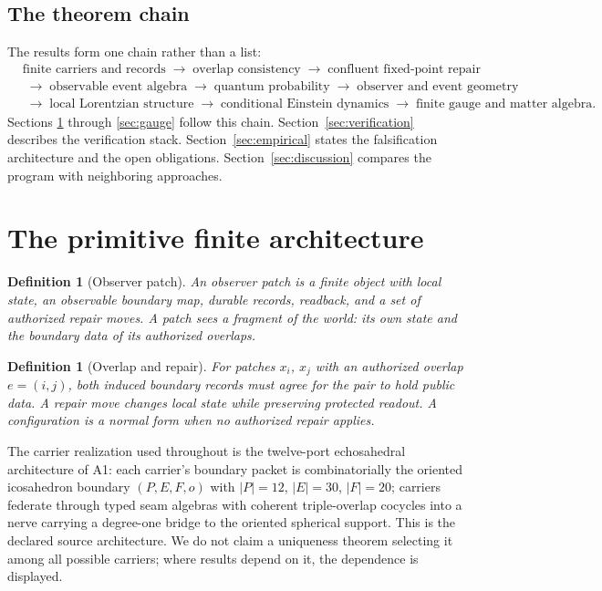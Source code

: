 \documentclass[11pt]{article}
\newtheorem{definition}[theorem]{Definition}
\theoremstyle{remark}
\begin{document}
\subsection{The theorem chain}

The results form one chain rather than a list:
\[
\begin{aligned}
&\text{finite carriers and records}
\;\longrightarrow\;
\text{overlap consistency}
\;\longrightarrow\;
\text{confluent fixed-point repair}\\
&\;\longrightarrow\;
\text{observable event algebra}
\;\longrightarrow\;
\text{quantum probability}
\;\longrightarrow\;
\text{observer and event geometry}\\
&\;\longrightarrow\;
\text{local Lorentzian structure}
\;\longrightarrow\;
\text{conditional Einstein dynamics}
\;\longrightarrow\;
\text{finite gauge and matter algebra}.
\end{aligned}
\]
Sections \ref{sec:architecture} through \ref{sec:gauge} follow this chain.
Section~\ref{sec:verification} describes the verification stack.
Section~\ref{sec:empirical} states the falsification architecture and the
open obligations. Section~\ref{sec:discussion} compares the program with
neighboring approaches.

\section{The primitive finite architecture}
\label{sec:architecture}

\begin{definition}[Observer patch]
An observer patch is a finite object with local state, an observable boundary
map, durable records, readback, and a set of authorized repair moves. A
patch sees a fragment of the world: its own state and the boundary data of
its authorized overlaps.
\end{definition}

\begin{definition}[Overlap and repair]
For patches $x_i$, $x_j$ with an authorized overlap $e=(i,j)$, both induced
boundary records must agree for the pair to hold public data. A repair move
changes local state while preserving protected readout. A configuration is a
normal form when no authorized repair applies.
\end{definition}

The carrier realization used throughout is the twelve-port echosahedral
architecture of A1: each carrier's boundary packet is combinatorially the
oriented icosahedron boundary $(P,E,F,o)$ with $|P|=12$, $|E|=30$,
$|F|=20$; carriers federate through typed seam algebras with coherent
triple-overlap cocycles into a nerve carrying a degree-one bridge to the
oriented spherical support. This is the declared source
architecture. We do not claim a uniqueness theorem selecting it among all
possible carriers; where results depend on it, the dependence is displayed.
\end{document}
